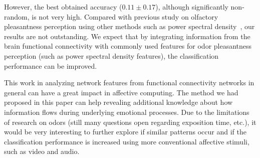 However, the best obtained accuracy ($0.11 \pm 0.17$), although significantly non-random, is not very high. Compared with previous study on olfactory pleasantness perception using other methods such as power spectral density~\cite{kroupi2014eeg}, our results are not outstanding. We expect that by integrating information from the brain functional connectivity with commonly used features for odor pleasantness perception (such as power spectral density features), the classification performance can be improved. 

This work in analyzing network features from functional connectivity networks in general can have a great impact in affective computing. The method we had proposed in this paper can help revealing additional knowledge about how information flows during underlying emotional processes. Due to the limitations of research on odors (still many questions open regarding exposition time, etc.), it would be very interesting to further explore if similar patterns occur and if the classification performance is increased using more conventional affective stimuli, such as video and audio.   


